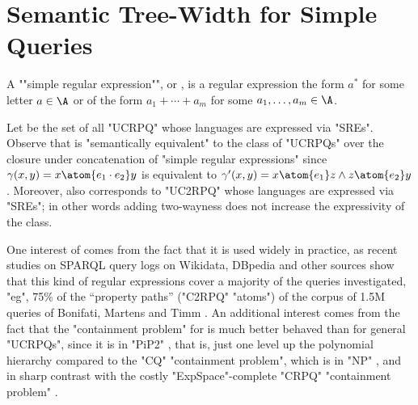 \section{\AP{}Semantic Tree-Width for Simple Queries}
\label{sec:sre}
\AP A ""simple regular expression"", or , is a regular expression the form $a^*$ for some letter $a \in \A$ or of the form $a_1 + \dotsb + a_m$ for some $a_1, \dotsc, a_m \in \A$. 

\AP Let \intro*{\UCRPQSRE} be the set of all "UCRPQ" whose languages are expressed via "SREs". Observe that {\UCRPQSRE} is "semantically equivalent" to the class of "UCRPQs" over the closure under concatenation of "simple regular expressions"
since $\gamma(x,y) = x \atom{e_1 \cdot e_2} y$ is equivalent to $\gamma'(x,y) = x \atom{e_1} z \land  z \atom{e_2} y$.
Moreover, \UCRPQSRE{} also corresponds to "UC2RPQ" whose languages are expressed via "SREs";
in other words adding two-wayness does not increase the expressivity of the class. 
%

One interest of {\UCRPQSRE} comes from the fact that it is used widely in practice, as recent studies on SPARQL query logs on Wikidata, DBpedia and other sources show that this kind of regular expressions cover a majority of the queries investigated, "eg", 75\% of
the ``property paths'' ("C2RPQ" "atoms") of the corpus of 1.5M queries of Bonifati, Martens and Timm \cite[Table 15]{BonifatiMartensTimm2020SPARQL}.
An additional interest comes from the fact that the "containment problem" for {\UCRPQSRE} is much better behaved than for general "UCRPQs", since it is in {"PiP2"} \cite[Corollary 5.2]{FigueiraEtal2020Containment}, that is, just one level up the polynomial hierarchy compared to the "CQ" "containment problem", which is in "NP" \cite{ChandraMerlin1977Implementation}, and in sharp contrast with the costly "ExpSpace"-complete "CRPQ" "containment problem" \cite{CalvaneseDeGiacomoLenzeriniVardi2000Containment,FlorescuLevySuciu1998Containment}.

